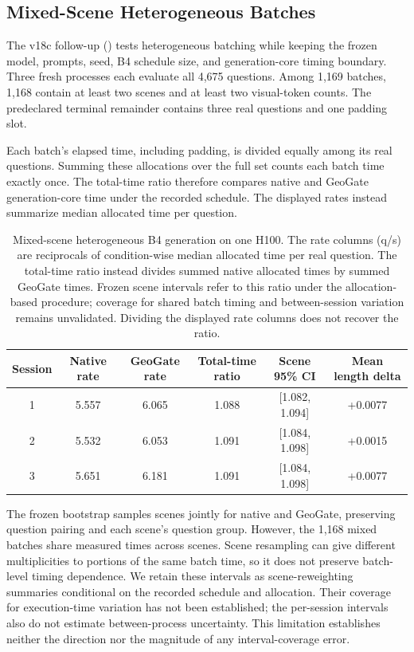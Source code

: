 \subsection{Mixed-Scene Heterogeneous Batches}
The v18c follow-up () tests heterogeneous batching while keeping the frozen model, prompts, seed, B4 schedule size, and generation-core timing boundary. Three fresh processes each evaluate all 4,675 questions. Among 1,169 batches, 1,168 contain at least two scenes and at least two visual-token counts. The predeclared terminal remainder contains three real questions and one padding slot.

Each batch's elapsed time, including padding, is divided equally among its real questions. Summing these allocations over the full set counts each batch time exactly once. The total-time ratio therefore compares native and GeoGate generation-core time under the recorded schedule. The displayed rates instead summarize median allocated time per question.

\begin{table}[t]
\centering
\caption{Mixed-scene heterogeneous B4 generation on one H100. The rate columns (q/s) are reciprocals of condition-wise median allocated time per real question. The total-time ratio instead divides summed native allocated times by summed GeoGate times. Frozen scene intervals refer to this ratio under the allocation-based procedure; coverage for shared batch timing and between-session variation remains unvalidated. Dividing the displayed rate columns does not recover the ratio.}
\label{tab:supp_hetero_batch}
\begin{tabular}{cccccc}
\toprule
Session & Native rate & GeoGate rate & Total-time ratio & Scene 95\% CI & Mean length delta \\
\midrule
1 & 5.557 & 6.065 & 1.088 & [1.082, 1.094] & +0.0077 \\
2 & 5.532 & 6.053 & 1.091 & [1.084, 1.098] & +0.0015 \\
3 & 5.651 & 6.181 & 1.091 & [1.084, 1.098] & +0.0077 \\
\bottomrule
\end{tabular}
\end{table}

The frozen bootstrap samples scenes jointly for native and GeoGate, preserving question pairing and each scene's question group. However, the 1,168 mixed batches share measured times across scenes. Scene resampling can give different multiplicities to portions of the same batch time, so it does not preserve batch-level timing dependence. We retain these intervals as scene-reweighting summaries conditional on the recorded schedule and allocation. Their coverage for execution-time variation has not been established; the per-session intervals also do not estimate between-process uncertainty. This limitation establishes neither the direction nor the magnitude of any interval-coverage error.

